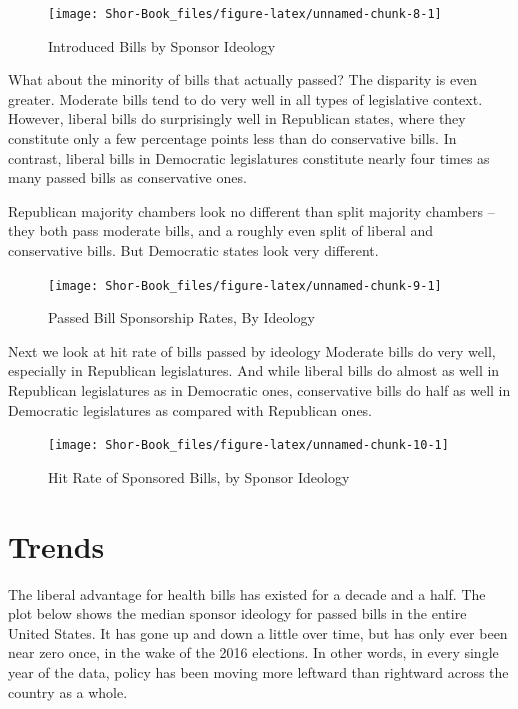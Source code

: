 \documentclass[
  oneside]{book}
\begin{document}
\begin{figure}
\texttt{[image: Shor-Book\_files/figure-latex/unnamed-chunk-8-1]} \caption{Introduced Bills by Sponsor Ideology}\label{fig:unnamed-chunk-8}
\end{figure}

What about the minority of bills that actually passed? The disparity is even greater. Moderate bills tend to do very well in all types of legislative context. However, liberal bills do surprisingly well in Republican states, where they constitute only a few percentage points less than do conservative bills. In contrast, liberal bills in Democratic legislatures constitute nearly four times as many passed bills as conservative ones.

Republican majority chambers look no different than split majority chambers -- they both pass moderate bills, and a roughly even split of liberal and conservative bills. But Democratic states look very different.

\begin{figure}
\texttt{[image: Shor-Book\_files/figure-latex/unnamed-chunk-9-1]} \caption{Passed Bill Sponsorship Rates, By Ideology}\label{fig:unnamed-chunk-9}
\end{figure}

Next we look at hit rate of bills passed by ideology Moderate bills do very well, especially in Republican legislatures. And while liberal bills do almost as well in Republican legislatures as in Democratic ones, conservative bills do half as well in Democratic legislatures as compared with Republican ones.

\begin{figure}
\texttt{[image: Shor-Book\_files/figure-latex/unnamed-chunk-10-1]} \caption{Hit Rate of Sponsored Bills, by Sponsor Ideology}\label{fig:unnamed-chunk-10}
\end{figure}

\hypertarget{trends}{%
\section{Trends}\label{trends}}

The liberal advantage for health bills has existed for a decade and a half. The plot below shows the median sponsor ideology for passed bills in the entire United States. It has gone up and down a little over time, but has only ever been near zero once, in the wake of the 2016 elections. In other words, in every single year of the data, policy has been moving more leftward than rightward across the country as a whole.
\end{document}
